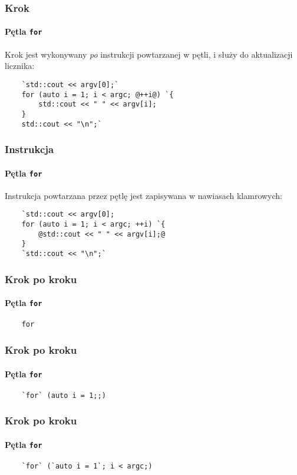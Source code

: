 \documentclass[aspectratio=169]{beamer}
\begin{document}
\begin{frame}[fragile]
    \frametitle{Krok}
    \framesubtitle{Pętla {\tt for}}

    Krok jest wykonywany \emph{po} instrukcji powtarzanej w pętli, i służy do
    aktualizacji licznika:

    \begin{lstlisting}
    `std::cout << argv[0];`
    for (auto i = 1; i < argc; @++i@) `{
        std::cout << " " << argv[i];
    }
    std::cout << "\n";`
    \end{lstlisting}
\end{frame}

\begin{frame}[fragile]
    \frametitle{Instrukcja}
    \framesubtitle{Pętla {\tt for}}

    Instrukcja powtarzana przez pętlę jest zapisywana w nawiasach klamrowych:

    \begin{lstlisting}
    `std::cout << argv[0];
    for (auto i = 1; i < argc; ++i) `{
        @std::cout << " " << argv[i];@
    }
    `std::cout << "\n";`
    \end{lstlisting}
\end{frame}

\begin{frame}[fragile]
    \frametitle{Krok po kroku}
    \framesubtitle{Pętla {\tt for}}

    \begin{lstlisting}
    for
    \end{lstlisting}
    \vspace{2.4em}
\end{frame}

\begin{frame}[fragile]
    \frametitle{Krok po kroku}
    \framesubtitle{Pętla {\tt for}}

    \begin{lstlisting}
    `for` (auto i = 1;;)
    \end{lstlisting}
    \vspace{2.4em}
\end{frame}

\begin{frame}[fragile]
    \frametitle{Krok po kroku}
    \framesubtitle{Pętla {\tt for}}

    \begin{lstlisting}
    `for` (`auto i = 1`; i < argc;)
    \end{lstlisting}
    \vspace{2.4em}
\end{frame}
\end{document}
